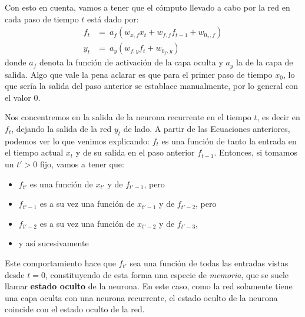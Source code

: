 \documentclass[../../main.tex]{subfiles}
\begin{document}
Con esto en cuenta, vamos a tener que el cómputo llevado a cabo por la red
en cada paso de tiempo \(t\) está dado por:
\begin{align}
    f_t &=\ a_f \left( w_{x,f} x_t  + w_{f,f} f_{t-1} + w_{0_x,f} \right) \label{eq:ft} \\
    y_t &=\ a_y \left( w_{f,y} f_t + w_{0_f, y} \right) \label{eq:yt}
\end{align}
donde \(a_f\) denota la función de activación de la capa oculta y \(a_y\) la de la capa de
salida. Algo que vale la pena aclarar es que para el primer paso de tiempo \(x_0\), lo que
sería la salida del paso anterior se establace manualmente, por lo general con el valor 0.

Nos concentremos en la salida de la neurona recurrente en el tiempo \(t\), es decir
en \(f_t\), dejando la salida de la red \(y_t\) de lado. A partir de las Ecuaciones
anteriores, podemos ver lo que venimos explicando: \(f_t\) es una función de
tanto la entrada en el tiempo actual \(x_t\) y de su salida en el paso anterior
\(f_{t-1}\). Entonces, si tomamos un \(t' > 0\) fijo, vamos a tener que:
\begin{itemize}[itemsep=0.05cm]
    \item \(f_{t'}\) es una función de \(x_{t'}\) y de \(f_{t'-1}\), pero
    \item \(f_{t'-1}\) es a su vez una función de \(x_{t'-1}\) y de \(f_{t'-2}\), pero
    \item \(f_{t'-2}\) es a su vez una función de \(x_{t'-2}\) y de \(f_{t'-3}\),
    \item y así sucesivamente
\end{itemize}
Este comportamiento hace que \(f_{t'}\) sea una función de todas las entradas vistas desde
\(t=0\), constituyendo de esta forma una especie de \textit{memoria}, que se suele llamar
\textbf{estado oculto} de la neurona. En este caso, como la red solamente tiene una capa
oculta con una neurona recurrente, el estado oculto de la neurona coincide con el estado
oculto de la red.
\end{document}
